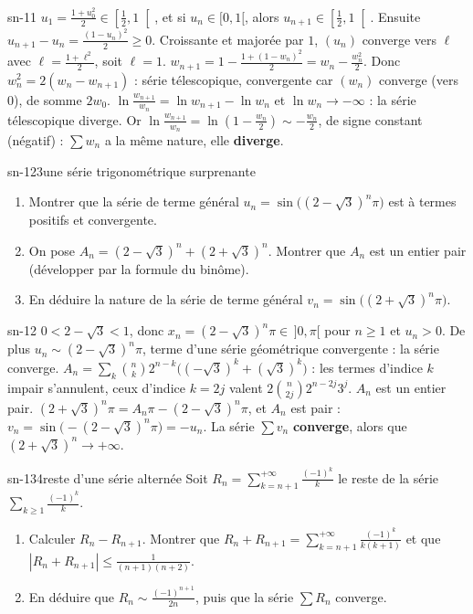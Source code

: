 \begin{corrige}{sn-11}
 $u_1=\frac{1+u_0^2}2\in\left[\frac12,1\right[$, et si $u_n\in[0,1[$, alors $u_{n+1}\in\left[\frac12,1\right[$. Ensuite
$u_{n+1}-u_n=\frac{(1-u_n)^2}2\geq0$. Croissante et majorée par $1$, $(u_n)$ converge vers $\ell$ avec $\ell=\frac{1+\ell^2}2$, soit $\ell=1$.
 $w_{n+1}=1-\frac{1+(1-w_n)^2}2=w_n-\frac{w_n^2}2$. Donc $w_n^2=2(w_n-w_{n+1})$ : série télescopique, convergente car $(w_n)$ converge
(vers $0$), de somme $2w_0$.
 $\ln\frac{w_{n+1}}{w_n}=\ln w_{n+1}-\ln w_n$ et $\ln w_n\to-\infty$ : la série télescopique diverge. Or
$\ln\frac{w_{n+1}}{w_n}=\ln\left(1-\frac{w_n}2\right)\sim-\frac{w_n}2$, de signe constant (négatif) : $\sum w_n$ a la même nature, elle
\textbf{diverge}.
\end{corrige}

\begin{exo}{sn-12}{3}{une série trigonométrique surprenante}
\begin{enumerate}
\item Montrer que la série de terme général $u_n=\sin\big((2-\sqrt3)^n\pi\big)$ est à termes positifs et convergente.
\item On pose $A_n=(2-\sqrt3)^n+(2+\sqrt3)^n$. Montrer que $A_n$ est un entier pair (développer par la formule du binôme).
\item En déduire la nature de la série de terme général $v_n=\sin\big((2+\sqrt3)^n\pi\big)$.
\end{enumerate}
\end{exo}

\begin{corrige}{sn-12}
 $0<2-\sqrt3<1$, donc $x_n=(2-\sqrt3)^n\pi\in\,]0,\pi[$ pour $n\geq1$ et $u_n>0$. De plus $u_n\sim(2-\sqrt3)^n\pi$, terme d'une série géométrique
convergente : la série converge.
 $A_n=\sum_k\binom nk2^{n-k}\big((-\sqrt3)^k+(\sqrt3)^k\big)$ : les termes d'indice $k$ impair s'annulent, ceux d'indice $k=2j$ valent
$2\binom n{2j}2^{n-2j}3^j$. $A_n$ est un entier pair.
 $(2+\sqrt3)^n\pi=A_n\pi-(2-\sqrt3)^n\pi$, et $A_n$ est pair : $v_n=\sin\big(-(2-\sqrt3)^n\pi\big)=-u_n$. La série $\sum v_n$
\textbf{converge}, alors que $(2+\sqrt3)^n\to+\infty$.
\end{corrige}

\begin{exo}{sn-13}{4}{reste d'une série alternée}
Soit $R_n=\sum_{k=n+1}^{+\infty}\frac{(-1)^k}k$ le reste de la série $\sum_{k\geq1}\frac{(-1)^k}k$.
\begin{enumerate}
\item Calculer $R_n-R_{n+1}$. Montrer que $R_n+R_{n+1}=\sum_{k=n+1}^{+\infty}\frac{(-1)^k}{k(k+1)}$ et que $|R_n+R_{n+1}|\leq\frac1{(n+1)(n+2)}$.
\item En déduire que $R_n\sim\frac{(-1)^{n+1}}{2n}$, puis que la série $\sum R_n$ converge.
\end{enumerate}
\end{exo}

